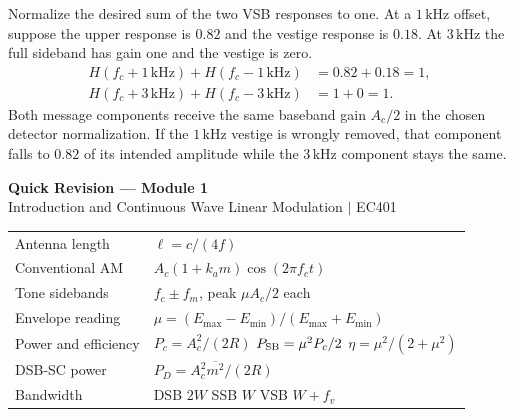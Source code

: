 \documentclass[12pt,a4paper]{article}
\renewcommand{\arraystretch}{1.45}
\begin{document}
\begin{tcolorbox}[examplebox, title={Check Complementary VSB Gain at Two Message Frequencies}]
Normalize the desired sum of the two VSB responses to one. At a $1\,\mathrm{kHz}$ offset, suppose the upper response is $0.82$ and the vestige response is $0.18$. At $3\,\mathrm{kHz}$ the full sideband has gain one and the vestige is zero.
\[
\begin{aligned}
 H(f_c+1\,\mathrm{kHz})+H(f_c-1\,\mathrm{kHz})&=0.82+0.18=1,\\
 H(f_c+3\,\mathrm{kHz})+H(f_c-3\,\mathrm{kHz})&=1+0=1.
\end{aligned}
\]
Both message components receive the same baseband gain $A_c/2$ in the chosen detector normalization. If the $1\,\mathrm{kHz}$ vestige is wrongly removed, that component falls to $0.82$ of its intended amplitude while the $3\,\mathrm{kHz}$ component stays the same.
\end{tcolorbox}

\newpage
\begin{center}
  {\large\bfseries\color{myred} Quick Revision --- Module 1}\\[3pt]
  {\small\color{mydark} Introduction and Continuous Wave Linear Modulation $|$ EC401}
\end{center}
\noindent{\color{myred}\rule{\linewidth}{1.2pt}}
\par\vspace{4pt}

\begin{tcolorbox}[formulabox, title={Key Formulas at a Glance}]
\renewcommand{\arraystretch}{1.35}
\noindent\begin{tabularx}{\linewidth}{B{4.4cm} Y}
Antenna length & $\ell=c/(4f)$ \\[4pt]
Conventional AM & $A_c(1+k_a m)\cos(2\pi f_ct)$ \\[4pt]
Tone sidebands & $f_c\pm f_m$, peak $\mu A_c/2$ each \\[4pt]
Envelope reading & $\mu=(E_{\max}-E_{\min})/(E_{\max}+E_{\min})$ \\[4pt]
Power and efficiency & $P_c=A_c^2/(2R)$ \newline $P_{\rm SB}=\mu^2P_c/2$ \quad $\eta=\mu^2/(2+\mu^2)$ \\[4pt]
DSB-SC power & $P_D=A_c^2\overline{m^2}/(2R)$ \\[4pt]
Bandwidth & DSB $2W$ \quad SSB $W$ \quad VSB $W+f_v$ \\[4pt]
\end{tabularx}\par
\end{tcolorbox}
\end{document}

